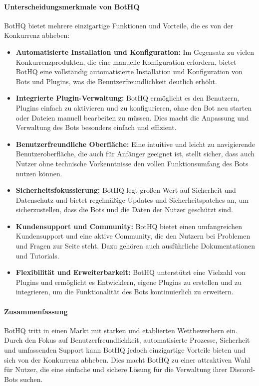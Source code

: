 \paragraph{Unterscheidungsmerkmale von BotHQ}
BotHQ bietet mehrere einzigartige Funktionen und Vorteile, die es von der Konkurrenz abheben:

\begin{itemize}
  \item \textbf{Automatisierte Installation und Konfiguration:}
  Im Gegensatz zu vielen Konkurrenzprodukten, die eine manuelle Konfiguration erfordern, bietet BotHQ eine vollständig automatisierte Installation und Konfiguration von Bots und Plugins, was die Benutzerfreundlichkeit deutlich erhöht.

  \item \textbf{Integrierte Plugin-Verwaltung:}
  BotHQ ermöglicht es den Benutzern, Plugins einfach zu aktivieren und zu konfigurieren, ohne den Bot neu starten oder Dateien manuell bearbeiten zu müssen. Dies macht die Anpassung und Verwaltung des Bots besonders einfach und effizient.

  \item \textbf{Benutzerfreundliche Oberfläche:}
  Eine intuitive und leicht zu navigierende Benutzeroberfläche, die auch für Anfänger geeignet ist, stellt sicher, dass auch Nutzer ohne technische Vorkenntnisse den vollen Funktionsumfang des Bots nutzen können.

  \item \textbf{Sicherheitsfokussierung:}
  BotHQ legt großen Wert auf Sicherheit und Datenschutz und bietet regelmäßige Updates und Sicherheitspatches an, um sicherzustellen, dass die Bots und die Daten der Nutzer geschützt sind.

  \item \textbf{Kundensupport und Community:}
  BotHQ bietet einen umfangreichen Kundensupport und eine aktive Community, die den Nutzern bei Problemen und Fragen zur Seite steht. Dazu gehören auch ausführliche Dokumentationen und Tutorials.

  \item \textbf{Flexibilität und Erweiterbarkeit:}
  BotHQ unterstützt eine Vielzahl von Plugins und ermöglicht es Entwicklern, eigene Plugins zu erstellen und zu integrieren, um die Funktionalität des Bots kontinuierlich zu erweitern.
\end{itemize}

\paragraph{Zusammenfassung}
BotHQ tritt in einen Markt mit starken und etablierten Wettbewerbern ein. Durch den Fokus auf Benutzerfreundlichkeit, automatisierte Prozesse, Sicherheit und umfassenden Support kann BotHQ jedoch einzigartige Vorteile bieten und sich von der Konkurrenz abheben. Dies macht BotHQ zu einer attraktiven Wahl für Nutzer, die eine einfache und sichere Lösung für die Verwaltung ihrer Discord-Bots suchen.

